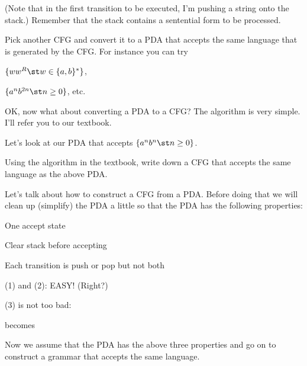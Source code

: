 (Note that in the first transition to be executed, I'm pushing a string onto
the stack.)
Remember that the stack contains a sentential form to be processed.

\newpage
\begin{ex}
Pick another CFG and convert it to a PDA that accepts the same language that is
generated by the CFG. 
For instance you can try
\begin{tightlist}
  \item[(a)] $\{ww^R \st w \in \{a, b\}^*\}$, 
  \item[(b)] $\{a^n b^{2n} \st n \geq 0 \}$, etc.
\end{tightlist}
\end{ex}

\newpage
OK, now what about converting a PDA to a CFG?
The algorithm is very simple.
I'll refer you to our textbook.

\begin{eg}
Let's look at our PDA that accepts $\{a^n b^n \st n \geq 0\}$.
\begin{center}

\end{center}
Using the algorithm in the textbook, write down a CFG that accepts the same
language as the above PDA.
\end{eg}


Let's talk about how to construct a CFG from a PDA.
Before doing that we will clean up (simplify) the PDA a little so that
the PDA has the following properties:
\begin{mylist}
 \item[(1)] One accept state
 \item[(2)] Clear stack before accepting
 \item[(3)] Each transition is push or pop but not both
\end{mylist}
(1) and (2): EASY! (Right?)

(3) is not too bad:

becomes


Now we assume that the PDA has the above three properties and go on
to construct a grammar that accepts the same language.

